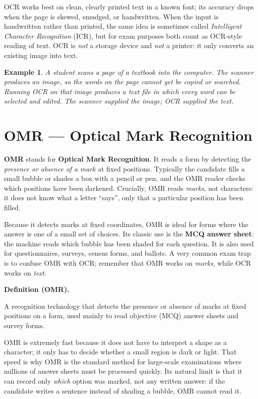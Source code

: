 \documentclass[11pt]{article}
\newtheorem{example}{Example}[section]
\newenvironment{definitionbox}[1]{%
  \par\noindent\textbf{Definition (#1).}\ \itshape
}{\par\vspace{0.3em}}
\begin{document}
OCR works best on clean, clearly printed text in a known font; its accuracy
drops when the page is skewed, smudged, or handwritten. When the input is
handwritten rather than printed, the same idea is sometimes called
\emph{Intelligent Character Recognition} (ICR), but for exam purposes both
count as OCR-style reading of text. OCR is \emph{not} a storage device and
\emph{not} a printer: it only converts an existing image into text.

\begin{example}
A student scans a page of a textbook into the computer. The scanner produces
an \emph{image}, so the words on the page cannot yet be copied or searched.
Running OCR on that image produces a text file in which every word can be
selected and edited. The scanner supplied the image; OCR supplied the text.
\end{example}

\section{OMR --- Optical Mark Recognition}
\textbf{OMR} stands for \textbf{Optical Mark Recognition}. It reads a form
by detecting the \emph{presence or absence of a mark} at fixed positions.
Typically the candidate fills a small bubble or shades a box with a pencil or
pen, and the OMR reader checks which positions have been darkened. Crucially,
OMR reads \emph{marks}, not characters: it does not know what a letter
``says'', only that a particular position has been filled.

Because it detects marks at fixed coordinates, OMR is ideal for forms where
the answer is one of a small set of choices. Its classic use is the
\textbf{MCQ answer sheet}: the machine reads which bubble has been shaded for
each question. It is also used for questionnaires, surveys, census forms, and
ballots. A very common exam trap is to confuse OMR with OCR; remember that
OMR works on \emph{marks}, while OCR works on \emph{text}.

\begin{definitionbox}{OMR}
A recognition technology that detects the presence or absence of marks at
fixed positions on a form, used mainly to read objective (MCQ) answer
sheets and survey forms.
\end{definitionbox}

OMR is extremely fast because it does not have to interpret a shape as a
character; it only has to decide whether a small region is dark or light.
That speed is why OMR is the standard method for large-scale examinations
where millions of answer sheets must be processed quickly. Its natural limit
is that it can record only \emph{which} option was marked, not any written
answer: if the candidate writes a sentence instead of shading a bubble, OMR
cannot read it.
\end{document}
